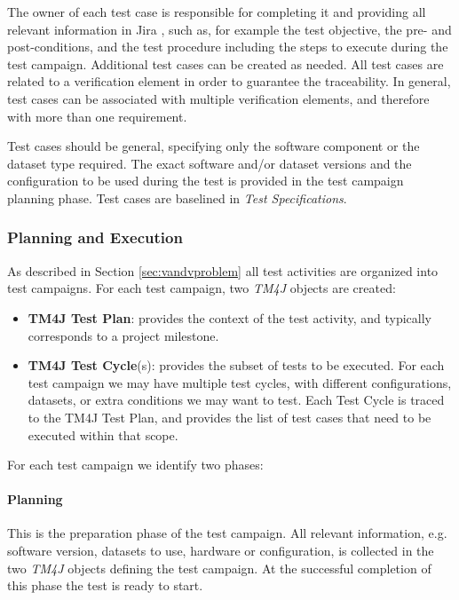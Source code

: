 The owner of each test case is responsible for completing it and providing all relevant information in Jira , such as,  for example 
the test objective, the pre- and post-conditions, and the test procedure including the steps to execute during the test campaign.
Additional test cases can be created as needed. All test cases are related to a verification element in order to guarantee the traceability.
In general, test cases can be associated with multiple verification elements, and therefore with more than one requirement.

Test cases should be general, specifying only the software component or the dataset type required.
The exact software and/or dataset versions and the configuration to be used during the test
is provided in the test campaign planning phase.
Test cases are baselined in \textit{Test Specifications}.

\subsubsection{Planning and Execution}

As described in Section \ref{sec:vandvproblem} all test activities are organized into test campaigns.
For each test campaign, two \textit{TM4J} objects are created:

\begin{itemize}
\item \textbf{TM4J Test Plan}: provides the context of the test activity, and typically corresponds to a project milestone.
\item \textbf{TM4J Test Cycle}(s): provides the subset of tests to be executed. For each test campaign we may have multiple test cycles,
with different configurations, datasets, or extra conditions we may want to test. Each Test Cycle is traced
to the TM4J Test Plan, and provides the list of test cases that need to be executed within that scope.
\end{itemize}

For each test campaign we identify two phases:

\paragraph{Planning}
This is the preparation phase of the test campaign. All relevant information, e.g. software version, datasets to use, 
hardware or configuration, is  collected in the two \textit{TM4J} objects defining the test campaign.
At the successful completion of this phase the test is ready to start.

